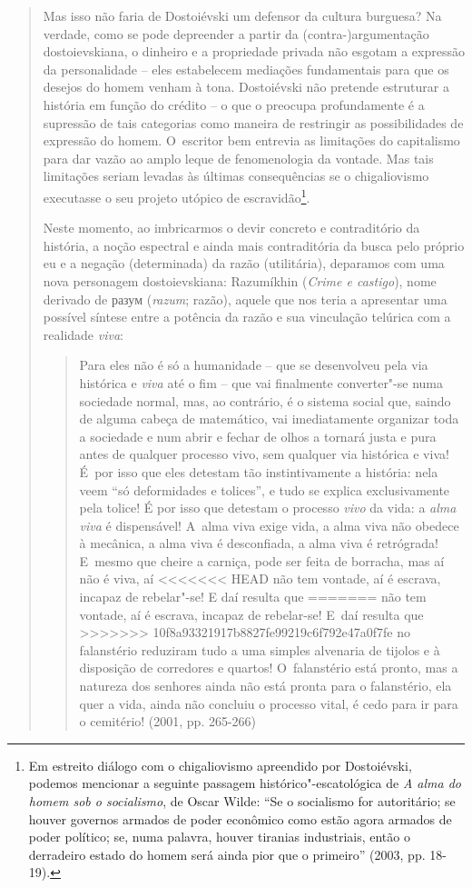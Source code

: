 {\begin{quote}
Mas isso não faria de Dostoiévski um defensor da cultura burguesa? Na
verdade, como se pode depreender a partir da (contra-)argumentação
dostoievskiana, o dinheiro e a propriedade privada não esgotam a
expressão da personalidade -- eles estabelecem mediações fundamentais
para que os desejos do homem venham à tona. Dostoiévski não pretende
estruturar a história em função do crédito -- o que o preocupa
profundamente é a supressão de tais categorias como maneira de
restringir as possibilidades de expressão do homem. O~escritor bem
entrevia as limitações do capitalismo para dar vazão ao amplo leque de
fenomenologia da vontade. Mas tais limitações seriam levadas às últimas
consequências se o chigaliovismo executasse o seu projeto utópico de
escravidão\footnote{Em estreito diálogo com o chigaliovismo apreendido
  por Dostoiévski, podemos mencionar a seguinte passagem
  histórico"-escatológica de \emph{A alma do homem sob o socialismo}, de
  Oscar Wilde: ``Se o socialismo for autoritário; se houver governos
  armados de poder econômico como estão agora armados de poder político;
  se, numa palavra, houver tiranias industriais, então o derradeiro
  estado do homem será ainda pior que o primeiro'' (2003, pp. 18-19).}.

Neste momento, ao imbricarmos o devir concreto e contraditório da
história, a noção espectral e ainda mais contraditória da busca pelo
próprio eu e a negação (determinada) da razão (utilitária), deparamos
com uma nova personagem dostoievskiana: Razumíkhin (\emph{Crime e
castigo}), nome derivado de
разум (\emph{razum};
razão), aquele que nos teria a apresentar uma possível síntese entre a
potência da razão e sua vinculação telúrica com a realidade \emph{viva}:

\begin{quote}
Para eles não é só a humanidade -- que se desenvolveu pela via histórica
e \emph{viva} até o fim -- que vai finalmente converter"-se numa
sociedade normal, mas, ao contrário, é o sistema social que, saindo de
alguma cabeça de matemático, vai imediatamente organizar toda a
sociedade e num abrir e fechar de olhos a tornará justa e pura antes de
qualquer processo vivo, sem qualquer via histórica e viva! É~por isso
que eles detestam tão instintivamente a história: nela veem ``só
deformidades e tolices'', e tudo se explica exclusivamente pela tolice!
É por isso que detestam o processo \emph{vivo} da vida: a \emph{alma
viva} é dispensável! A~alma viva exige vida, a alma viva não obedece à
mecânica, a alma viva é desconfiada, a alma viva é retrógrada! E~mesmo
que cheire a carniça, pode ser feita de borracha, mas aí não é viva, aí
<<<<<<< HEAD
não tem vontade, aí é escrava, incapaz de rebelar"-se! E daí resulta que
=======
não tem vontade, aí é escrava, incapaz de rebelar-se! E~daí resulta que
>>>>>>> 10f8a93321917b8827fe99219c6f792e47a0f7fe
no falanstério reduziram tudo a uma simples alvenaria de tijolos e à
disposição de corredores e quartos! O~falanstério está pronto, mas a
natureza dos senhores ainda não está pronta para o falanstério, ela quer
a vida, ainda não concluiu o processo vital, é cedo para ir para o
cemitério! (2001, pp. 265-266)
\end{quote}


\end{quote}}
